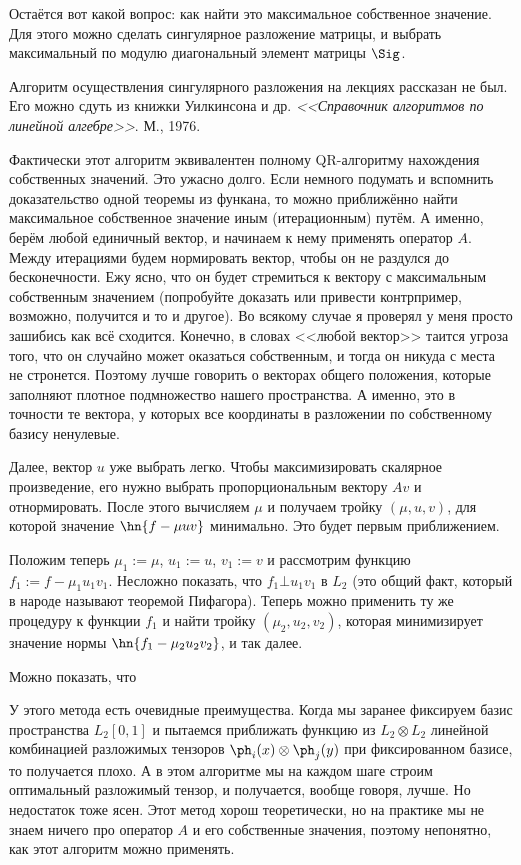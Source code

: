 \documentclass[a4paper]{article}
\begin{document}
\begin{petit}
Остаётся вот какой вопрос: как найти это максимальное собственное
значение. Для этого можно сделать сингулярное разложение матрицы, и
выбрать максимальный по модулю диагональный элемент матрицы $\Sig$.

Алгоритм осуществления сингулярного разложения на лекциях рассказан не
был. Его можно сдуть из книжки Уилкинсона и др. \emph{<<Справочник
  алгоритмов по линейной алгебре>>}. М., 1976.

Фактически этот алгоритм эквивалентен полному QR-алгоритму нахождения
собственных значений. Это ужасно долго.  Если немного подумать и
вспомнить доказательство одной теоремы из функана, то можно
приближённо найти максимальное собственное значение иным
(итерационным) путём. А именно, берём любой единичный вектор, и
начинаем к нему применять оператор $A$.  Между итерациями будем
нормировать вектор, чтобы он не раздулся до бесконечности. Ежу ясно,
что он будет стремиться к вектору с максимальным собственным значением
(попробуйте доказать или привести контрпример, возможно, получится и
то и другое).  Во всякому случае я проверял у меня просто зашибись как
всё сходится. Конечно, в словах <<любой вектор>> таится угроза того,
что он случайно может оказаться собственным, и тогда он никуда с места
не стронется. Поэтому лучше говорить о векторах общего положения,
которые заполняют плотное подмножество нашего пространства. А именно,
это в точности те вектора, у которых все координаты в разложении по
собственному базису ненулевые.
\end{petit}

Далее, вектор $u$ уже выбрать легко. Чтобы максимизировать скалярное
произведение, его нужно выбрать пропорциональным вектору $Av$ и
отнормировать. После этого вычисляем $\mu$ и получаем тройку $(\mu,
u,v)$, для которой значение $\hn{f - \mu u v}$ минимально. Это будет
первым приближением.

Положим теперь $\mu_1 := \mu$, $u_1 := u$, $v_1 := v$ и рассмотрим
функцию $f_1 := f - \mu_1u_1v_1$.  Несложно показать, что $f_1 \bot
u_1v_1$ в $L_2$ (это общий факт, который в народе называют теоремой
Пифагора). Теперь можно применить ту же процедуру к функции $f_1$ и
найти тройку $(\mu_2,u_2,v_2)$, которая минимизирует значение нормы
$\hn{f_1 - \mu_2 u_2 v_2}$, и так далее.

Можно показать, что 

У этого метода есть очевидные преимущества. Когда мы заранее фиксируем
базис пространства $L_2[0,1]$ и пытаемся приближать функцию из
$L_2\otimes L_2$ линейной комбинацией разложимых тензоров
$\ph_i(x)\otimes \ph_j(y)$ при фиксированном базисе, то получается
плохо. А в этом алгоритме мы на каждом шаге строим оптимальный
разложимый тензор, и получается, вообще говоря, лучше. Но недостаток
тоже ясен. Этот метод хорош теоретически, но на практике мы не знаем
ничего про оператор $A$ и его собственные значения, поэтому непонятно,
как этот алгоритм можно применять.
\end{document}
